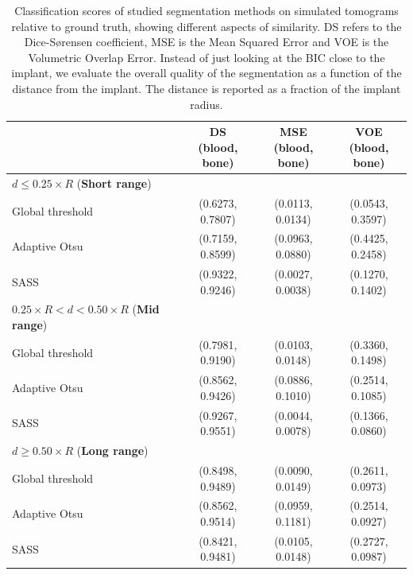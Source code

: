 \begin{table}[]
\caption{
	Classification scores of studied segmentation methods on simulated
	tomograms relative to ground truth, showing different aspects of
	similarity. DS refers to the Dice-Sørensen coefficient, MSE is the Mean
	Squared Error and VOE is the Volumetric Overlap Error. Instead of just
	looking at the BIC close to the implant, we evaluate the overall
	quality of the segmentation as a function of the distance from the
	implant. The distance is reported as a fraction of the implant radius.
        }
\label{tab:scores}
\centering
\begin{tabular}{lccc}
 & \shortstack{DS \\ (blood, bone)} & \shortstack{MSE \\ (blood, bone)} & \shortstack{VOE \\ (blood, bone)}\\
\toprule
$d \leq 0.25 \times R$ (\textbf{Short range}) & & &  \\
\midrule
Global threshold & (0.6273, 0.7807) & (0.0113, 0.0134) & (0.0543, 0.3597) \\
Adaptive Otsu    & (0.7159, 0.8599) & (0.0963, 0.0880) & (0.4425, 0.2458) \\
SASS             & (0.9322, 0.9246) & (0.0027, 0.0038) & (0.1270, 0.1402) \\
\toprule
$ 0.25 \times R < d < 0.50 \times R$ (\textbf{Mid range}) & & & \\
\midrule
Global threshold & (0.7981, 0.9190) & (0.0103, 0.0148) & (0.3360, 0.1498) \\
Adaptive Otsu    & (0.8562, 0.9426) & (0.0886, 0.1010) & (0.2514, 0.1085) \\
SASS             & (0.9267, 0.9551) & (0.0044, 0.0078) & (0.1366, 0.0860) \\
\toprule
$d \geq 0.50 \times R$ (\textbf{Long range}) & & & \\
\midrule
Global threshold & (0.8498, 0.9489) & (0.0090, 0.0149) & (0.2611, 0.0973) \\
Adaptive Otsu    & (0.8562, 0.9514) & (0.0959, 0.1181) & (0.2514, 0.0927) \\
SASS             & (0.8421, 0.9481) & (0.0105, 0.0148) & (0.2727, 0.0987) \\
\bottomrule
\end{tabular}
\end{table}

